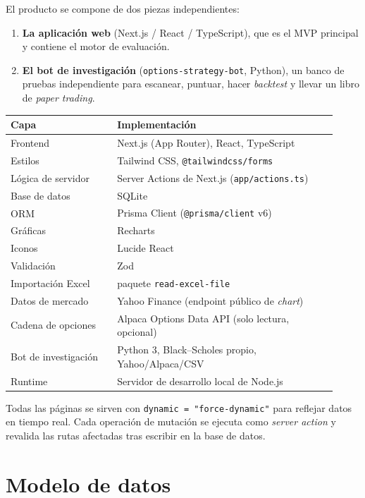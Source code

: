 \documentclass[11pt,letterpaper]{article}
\begin{document}
El producto se compone de dos piezas independientes:

\begin{enumerate}[noitemsep]
  \item \textbf{La aplicación web} (Next.js / React / TypeScript), que es el MVP
        principal y contiene el motor de evaluación.
  \item \textbf{El bot de investigación} (\texttt{options-strategy-bot}, Python),
        un banco de pruebas independiente para escanear, puntuar, hacer
        \emph{backtest} y llevar un libro de \emph{paper trading}.
\end{enumerate}

\begin{longtable}{p{0.30\linewidth} p{0.62\linewidth}}
\toprule
\textbf{Capa} & \textbf{Implementación} \\
\midrule
Frontend & Next.js (App Router), React, TypeScript \\
Estilos & Tailwind CSS, \texttt{@tailwindcss/forms} \\
Lógica de servidor & Server Actions de Next.js (\texttt{app/actions.ts}) \\
Base de datos & SQLite \\
ORM & Prisma Client (\texttt{@prisma/client} v6) \\
Gráficas & Recharts \\
Iconos & Lucide React \\
Validación & Zod \\
Importación Excel & paquete \texttt{read-excel-file} \\
Datos de mercado & Yahoo Finance (endpoint público de \emph{chart}) \\
Cadena de opciones & Alpaca Options Data API (solo lectura, opcional) \\
Bot de investigación & Python 3, Black--Scholes propio, Yahoo/Alpaca/CSV \\
Runtime & Servidor de desarrollo local de Node.js \\
\bottomrule
\end{longtable}

\noindent
Todas las páginas se sirven con \texttt{dynamic = "force-dynamic"} para reflejar
datos en tiempo real. Cada operación de mutación se ejecuta como \emph{server
action} y revalida las rutas afectadas tras escribir en la base de datos.

\section{Modelo de datos}
\end{document}
